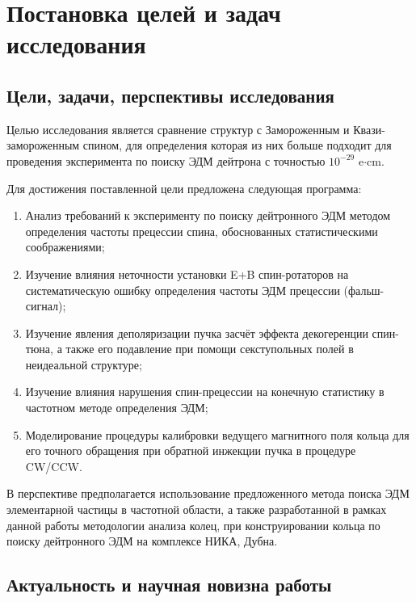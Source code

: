 \documentclass{report}
\begin{document}
\singlespacing


\tableofcontents 
\pagebreak

\onehalfspacing

\chapter{Постановка целей и задач исследования}

\section{Цели, задачи, перспективы исследования}\label{sec:research_program}

Целью исследования является сравнение структур с Замороженным и Квази-замороженным спином, для определения которая из них больше подходит для проведения эксперимента по поиску ЭДМ дейтрона с точностью $10^{-29}$ e$\cdot$cm.

Для достижения поставленной цели предложена следующая программа:
\begin{enumerate}
\item Анализ требований к эксперименту по поиску дейтронного ЭДМ методом определения частоты прецессии спина, обоснованных статистическими соображениями;
\item Изучение влияния неточности установки E+B спин-ротаторов на систематическую ошибку определения частоты ЭДМ прецессии (фальш-сигнал);
\item Изучение явления деполяризации пучка засчёт эффекта декогеренции спин-тюна, а также его подавление при помощи секступольных полей в неидеальной структуре;
\item Изучение влияния нарушения спин-прецессии на конечную статистику в частотном методе определения ЭДМ;
\item Моделирование процедуры калибровки ведущего магнитного поля кольца для его точного обращения при обратной инжекции пучка в процедуре CW/CCW.
\end{enumerate}

В перспективе предполагается использование предложенного метода поиска ЭДМ элементарной частицы в частотной области, а также разработанной в рамках данной работы методологии анализа колец, при конструировании кольца по поиску дейтронного ЭДМ на комплексе НИКА, Дубна.

\section{Актуальность и научная новизна работы}
\end{document}
